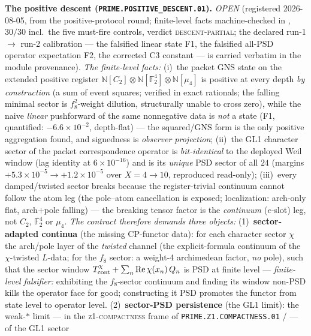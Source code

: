 \documentclass[11pt,a4paper]{article}
\begin{document}
\par\smallskip\noindent\textbf{The positive descent
(\texttt{PRIME.POSITIVE\_DESCENT.01}).}
{\sloppy
\emph{OPEN} (registered 2026-08-05, from the positive-protocol
round; finite-level facts machine-checked in
, $30/30$ incl.\ the five
must-fire controls, verdict \textsc{descent-partial}; the declared
run-1 $\to$ run-2 calibration --- the falsified linear state F1,
the falsified all-PSD operator expectation F2, the corrected C3
constant --- is carried verbatim in the module provenance).
\emph{The finite-level facts:} (i)~the packet GNS state on the
extended positive register
$\mathbb N[C_2]\otimes\mathbb N[\mathbb F_2^4]\otimes
\mathbb N[\mu_4]$ is positive at every depth \emph{by
construction} (a sum of event squares; verified in exact
rationals; the falling minimal sector is $f_8^2$-weight dilution,
structurally unable to cross zero), while the naive \emph{linear}
pushforward of the same nonnegative data is \emph{not} a state
(F1, quantified: $-6.6\times10^{-2}$, depth-flat) --- the
squared/GNS form is the only positive aggregation found, and
signedness is \emph{observer projection}; (ii)~the GL1 character
sector of the packet correspondence operator is
\emph{bit-identical} to the deployed Weil window (lag identity at
$6\times10^{-16}$) and is its \emph{unique} PSD sector of all $24$
(margins $+5.3\times10^{-5}\to+1.2\times10^{-5}$ over $X=4\to10$,
reproduced read-only); (iii)~every damped/twisted sector breaks
because the register-trivial continuum cannot follow the atom leg
(the pole--atom cancellation is exposed; localization: arch-only
flat, arch$+$pole falling) --- the breaking tensor factor is the
\emph{continuum} ($e$-slot) leg, not $C_2$, $\mathbb F_2^4$ or
$\mu_4$.  \emph{The contract therefore demands three objects:}
(1)~\textbf{sector-adapted continua} (the missing CP-functor
data): for each character sector $\chi$ the arch/pole layer of the
\emph{twisted} channel (the explicit-formula continuum of the
$\chi$-twisted $L$-data; for the $f_8$ sector: a weight-4
archimedean factor, \emph{no} pole), such that the sector window
$T_{\rm cont}^{\chi}+\sum_n\operatorname{Re}\chi(x_n)\,Q_n$ is PSD
at finite level --- \emph{finite-level falsifier:} exhibiting the
$f_8$-sector continuum and finding its window non-PSD kills the
operator face for good; constructing it PSD promotes the functor
from state level to operator level.  (2)~\textbf{sector-PSD
persistence} (the GL1 limit): the weak-$*$ limit --- in the
\textsc{z1-compactness} frame of
\texttt{PRIME.Z1.COMPACTNESS.01} /
 --- of the GL1 sector
}
\end{document}
